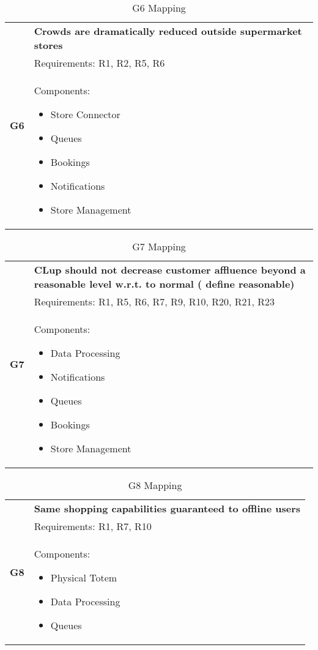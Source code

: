 \begin{table}[H]
	\begin{tabular}{|c|p{14cm}|}
		\hline
		\multirow{3}{*}[-4em]{\textbf{G6}} & \cellcolor{Dandelion} \textbf{Crowds are dramatically reduced outside supermarket stores}\\ \cline{2-2}
		& \cellcolor{GreenYellow} Requirements: R1, R2, R5, R6 \\ \cline{2-2}
		& \cellcolor{SkyBlue} Components: \begin{itemize}
			\item Store Connector
			\item Queues
			\item Bookings
			\item Notifications
			\item Store Management
		\end{itemize}\\ \hline
	\end{tabular}
	\label{tab:G6Mapping}
	\caption{G6 Mapping}
\end{table}

\begin{table}[H]
	\begin{tabular}{|c|p{14cm}|}
		\hline
		\multirow{3}{*}[-5em]{\textbf{G7}} & \cellcolor{Dandelion} \textbf{CLup should not decrease customer affluence beyond a reasonable level w.r.t. to
normal ( define reasonable)}\\ \cline{2-2}
		& \cellcolor{GreenYellow} Requirements: R1, R5, R6, R7, R9, R10, R20, R21, R23\\ \cline{2-2}
		& \cellcolor{SkyBlue} Components: \begin{itemize}
			\item Data Processing
			\item Notifications
			\item Queues
			\item Bookings
			\item Store Management
		\end{itemize}\\ \hline
	\end{tabular}
	\label{tab:G7Mapping}
	\caption{G7 Mapping}
\end{table}

\begin{table}[H]
	\begin{tabular}{|c|p{14cm}|}
		\hline
		\multirow{3}{*}[-3em]{\textbf{G8}} & \cellcolor{Dandelion} \textbf{Same shopping capabilities guaranteed to offline users}\\ \cline{2-2}
		& \cellcolor{GreenYellow} Requirements: R1, R7, R10\\ \cline{2-2}
		& \cellcolor{SkyBlue} Components: \begin{itemize}
			\item Physical Totem
			\item Data Processing
			\item Queues
		\end{itemize}\\ \hline
	\end{tabular}
	\label{tab:G8Mapping}
	\caption{G8 Mapping}
\end{table}


